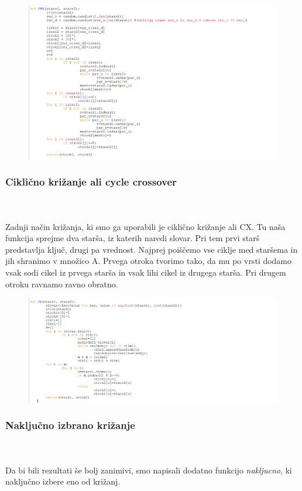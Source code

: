 \documentclass[12pt,a4paper]{amsart}
\theoremstyle{definition} %
\theoremstyle{plain} %
\begin{document}
\begin{figure}[ht]
\centering
\includegraphics[width=1\textwidth]{PMX}
\end{figure}
\newpage
\subsubsection{Ciklično križanje ali cycle crossover}
\
\\
\\
Zadnji način križanja, ki smo ga uporabili je ciklično križanje ali CX. Tu naša funkcija sprejme dva starša, iz katerih naredi slovar. Pri tem prvi starš predstavlja ključ, drugi pa vrednost. Najprej poiščemo vse ciklje med staršema in jih shranimo v množico A. Prvega otroka tvorimo tako, da mu po vrsti dodamo vsak sodi cikel iz prvega starša in vsak lihi cikel iz drugega starša. Pri drugem otroku ravnamo ravno obratno.  

\begin{figure}[ht]
\centering
\includegraphics[width=1\textwidth]{CX}
\end{figure}

\subsubsection{Naključno izbrano križanje}
\
\\
\\
Da bi bili rezultati še bolj zanimivi, smo napisali dodatno funkcijo \textit{nakljucno}, ki naključno izbere eno od križanj. 
\end{document}
